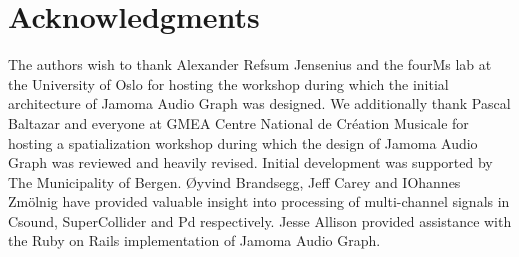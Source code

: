 \documentclass[twoside,a4paper]{article}
\begin{document}




%
\section{Acknowledgments} %
%

The authors wish to thank Alexander Refsum Jensenius and the fourMs lab at the University of Oslo for hosting the workshop during which the initial architecture of Jamoma Audio Graph was designed. %
We additionally thank Pascal Baltazar and everyone at GMEA Centre National de Cr\' eation Musicale for hosting a spatialization workshop during which the design of Jamoma Audio Graph was reviewed and heavily revised. %
Initial development was supported by The Municipality of Bergen.  
\O yvind Brandsegg, Jeff Carey and IOhannes Zm\"olnig have provided valuable insight into processing of multi-channel signals in Csound, SuperCollider and Pd respectively.
Jesse Allison provided assistance with the Ruby on Rails implementation of Jamoma Audio Graph.





\end{document}
